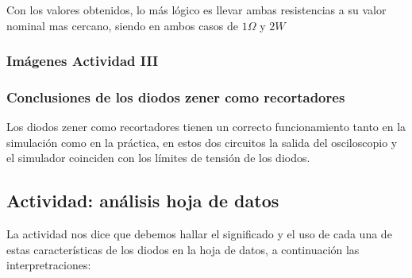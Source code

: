 	\sangria{} Con los valores obtenidos, lo más lógico es llevar ambas resistencias a su valor nominal mas cercano, siendo en ambos casos de $1\Omega$ y $2W$

\newpage

		\subsubsection{Imágenes Actividad III}





		\subsubsection{Conclusiones de los diodos zener como recortadores}
		\sangria{} Los diodos zener como recortadores tienen un correcto funcionamiento tanto en la simulación como en la práctica, en estos dos circuitos la salida del osciloscopio y el simulador coinciden con los límites de tensión de los diodos.

	\subsection{Actividad: análisis hoja de datos}
	\sangria{} La actividad nos dice que debemos hallar el significado y el uso de cada una de estas características de los diodos en la hoja de datos, a continuación las interpretraciones:



